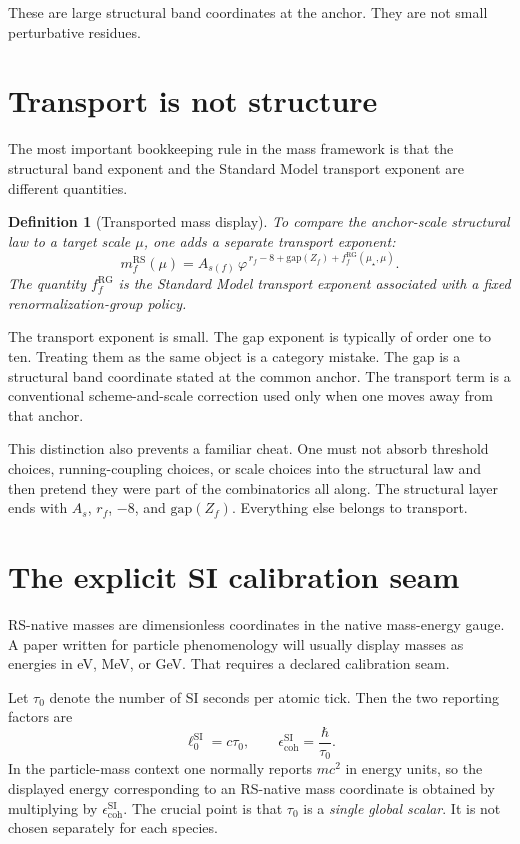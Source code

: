 \documentclass[11pt]{article}
\newtheorem{definition}{Definition}
\newcommand{\phig}{\varphi}
\newcommand{\mustar}{\mu_\star}
\begin{document}
These are large structural band coordinates at the anchor. They are not small perturbative residues.

\section{Transport is not structure}

The most important bookkeeping rule in the mass framework is that the structural band exponent and the Standard Model transport exponent are different quantities.

\begin{definition}[Transported mass display]
To compare the anchor-scale structural law to a target scale \(\mu\), one adds a separate transport exponent:
\[
  m_f^{\mathrm{RS}}(\mu)
  = A_{s(f)}\,\phig^{\,r_f - 8 + \mathrm{gap}(Z_f) + f_f^{\mathrm{RG}}(\mustar,\mu)}.
\]
The quantity \(f_f^{\mathrm{RG}}\) is the Standard Model transport exponent associated with a fixed renormalization-group policy.
\end{definition}

The transport exponent is small. The gap exponent is typically of order one to ten. Treating them as the same object is a category mistake. The gap is a structural band coordinate stated at the common anchor. The transport term is a conventional scheme-and-scale correction used only when one moves away from that anchor.

This distinction also prevents a familiar cheat. One must not absorb threshold choices, running-coupling choices, or scale choices into the structural law and then pretend they were part of the combinatorics all along. The structural layer ends with \(A_s\), \(r_f\), \(-8\), and \(\mathrm{gap}(Z_f)\). Everything else belongs to transport.

\section{The explicit SI calibration seam}

RS-native masses are dimensionless coordinates in the native mass-energy gauge. A paper written for particle phenomenology will usually display masses as energies in eV, MeV, or GeV. That requires a declared calibration seam.

Let \(\tau_0\) denote the number of SI seconds per atomic tick. Then the two reporting factors are
\[
  \ell_0^{\mathrm{SI}} = c\tau_0,
  \qquad
  \epsilon_{\mathrm{coh}}^{\mathrm{SI}} = \frac{\hbar}{\tau_0}.
\]
In the particle-mass context one normally reports \(mc^2\) in energy units, so the displayed energy corresponding to an RS-native mass coordinate is obtained by multiplying by \(\epsilon_{\mathrm{coh}}^{\mathrm{SI}}\). The crucial point is that \(\tau_0\) is a \emph{single global scalar}. It is not chosen separately for each species.
\end{document}
